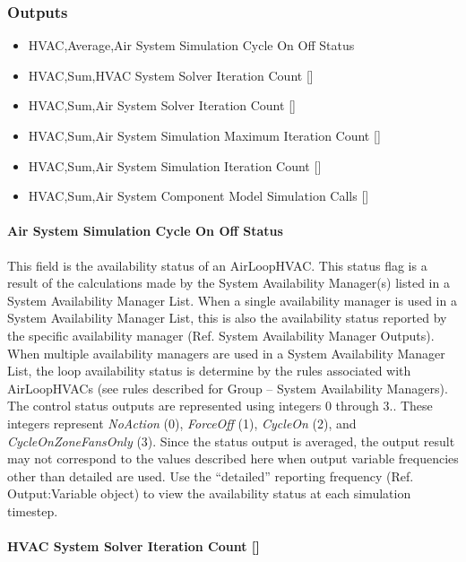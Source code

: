 \subsubsection{Outputs}\label{outputs-001}

\begin{itemize}
\item
  HVAC,Average,Air System Simulation Cycle On Off Status
\item
  HVAC,Sum,HVAC System Solver Iteration Count {[]}
\item
  HVAC,Sum,Air System Solver Iteration Count {[]}
\item
  HVAC,Sum,Air System Simulation Maximum Iteration Count {[]}
\item
  HVAC,Sum,Air System Simulation Iteration Count {[]}
\item
  HVAC,Sum,Air System Component Model Simulation Calls {[]}
\end{itemize}

\paragraph{Air System Simulation Cycle On Off Status}\label{air-system-simulation-cycle-on-off-status}

This field is the availability status of an AirLoopHVAC. This status flag is a result of the calculations made by the System Availability Manager(s) listed in a System Availability Manager List. When a single availability manager is used in a System Availability Manager List, this is also the availability status reported by the specific availability manager (Ref. System Availability Manager Outputs). When multiple availability managers are used in a System Availability Manager List, the loop availability status is determine by the rules associated with AirLoopHVACs (see rules described for Group -- System Availability Managers). The control status outputs are represented using integers 0 through 3.. These integers represent \emph{NoAction} (0), \emph{ForceOff} (1), \emph{CycleOn} (2), and \emph{CycleOnZoneFansOnly} (3). Since the status output is averaged, the output result may not correspond to the values described here when output variable frequencies other than detailed are used. Use the ``detailed'' reporting frequency (Ref. Output:Variable object) to view the availability status at each simulation timestep.

\paragraph{HVAC System Solver Iteration Count {[]}}\label{hvac-system-solver-iteration-count}

